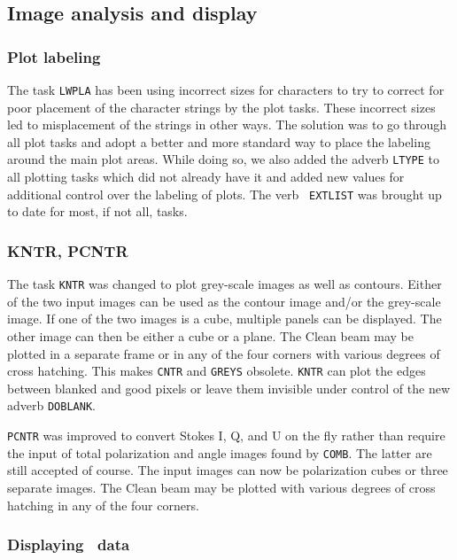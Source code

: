 \subsection{Image analysis and display}

\subsubsection{Plot labeling}

The task {\tt LWPLA} has been using incorrect sizes for characters to
try to correct for poor placement of the character strings by the plot
tasks.  These incorrect sizes led to misplacement of the strings in
other ways.  The solution was to go through all plot tasks and adopt a
better and more standard way to place the labeling around the main
plot areas.  While doing so, we also added the adverb {\tt LTYPE} to
all plotting tasks which did not already have it and added new values
for additional control over the labeling of plots.  The verb {\tt
EXTLIST} was brought up to date for most, if not all, tasks.

\vfill\eject
\subsubsection{KNTR, PCNTR}

The task {\tt KNTR} was changed to plot grey-scale images as well as
contours.  Either of the two input images can be used as the contour
image and/or the grey-scale image.  If one of the two images is a
cube, multiple panels can be displayed.  The other image can then be
either a cube or a plane.  The Clean beam may be plotted in a separate
frame or in any of the four corners with various degrees of cross
hatching.  This makes {\tt CNTR} and {\tt GREYS} obsolete.  {\tt KNTR}
can plot the edges between blanked and good pixels or leave them
invisible under control of the new adverb \hbox{{\tt DOBLANK}}.

{\tt PCNTR} was improved to convert Stokes I, Q, and U on the fly rather
than require the input of total polarization and angle images found by
\hbox{{\tt COMB}}.  The latter are still accepted of course.  The
input images can now be polarization cubes or three separate images.
The Clean beam may be plotted with various degrees of cross hatching
in any of the four corners.

\subsubsection{Displaying \uv\ data}

